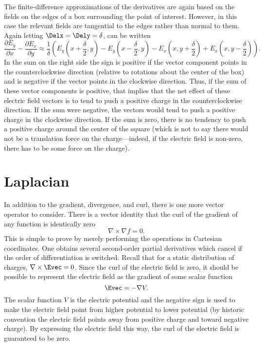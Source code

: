 The finite-difference approximations of the derivatives are again
based on the fields on the edges of a box surrounding the point of
interest.  However, in this case the relevant fields are tangential to
the edges rather than normal to them.  Again letting
$\Delx=\Dely=\delta$,  can be written
\begin{equation}
  \frac{\partial E_y}{\partial x} -
  \frac{\partial E_x}{\partial y} \approx 
  \frac{1}{\delta}
  \left(E_y\left(x+\frac{\delta}{2},y\right) -
        E_y\left(x-\frac{\delta}{2},y\right) -
        E_x\left(x,y+\frac{\delta}{2}\right) +
        E_x\left(x,y-\frac{\delta}{2}\right)\right).
  \label{eq:curlIII}
\end{equation}
In the sum on the right side the sign is positive if the vector
component points in the counterclockwise direction (relative to
rotations about the center of the box) and is negative if the vector
points in the clockwise direction.  Thus, if the sum of these vector
components is positive, that implies that the net effect of these
electric field vectors is to tend to push a positive charge in the
counterclockwise direction.  If the sum were negative, the vectors
would tend to push a positive charge in the clockwise direction.  If
the sum is zero, there is no tendency to push a positive charge around
the center of the square (which is not to say there would not be a
translation force on the charge---indeed, if the electric field is
non-zero, there has to be some force on the charge).

\section{Laplacian}

In addition to the gradient, divergence, and curl, there is one more
vector operator to consider.  There is a vector identity that the curl
of the gradient of any function is identically zero
\begin{equation}
  \nabla\times\nabla f = 0.
  \label{eq:vecIdent}
\end{equation}
This is simple to prove by merely performing the operations in
Cartesian coordinates.  One obtains several second-order partial
derivatives which cancel if the order of differentiation is switched.
Recall that for a static distribution of charges, $\nabla\times\Evec=0$.
Since the curl of the electric field is zero, it should be possible to
represent the electric field as the gradient of some scalar function
\begin{equation}
  \Evec = -\nabla V.
  \label{eq:potential}
\end{equation}
The scalar function $V$ is the electric potential and the negative
sign is used to make the electric field point from higher potential to
lower potential (by historic convention the electric field points away
from positive charge and toward negative charge).  By expressing the
electric field this way, the curl of the electric field is guaranteed
to be zero.

